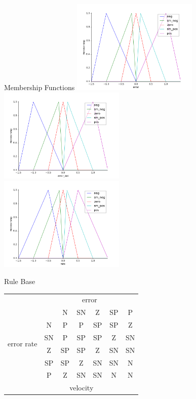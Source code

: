 \documentclass[]{beamer}
\begin{document}
\begin{frame}{Membership Functions}
    \centering
    \vspace{1em}
    \includegraphics[width=0.45\textwidth]{../images/error_in.png}
    \includegraphics[width=0.45\textwidth]{../images/error_del_in.png}\\
    \includegraphics[width=0.45\textwidth]{../images/vel_out.png}
\end{frame}

\begin{frame}[fragile]{Rule Base}
    \centering
    \hspace{3em}
    \begin{tabular}{cc||c|c|c|c|c|}
        &  \multicolumn{6}{c}{error}  \\ 	
        \multirow{6}{*}{error rate} &    & N  & SN & Z  & SP & P  \\ 	\hhline{~=#=|=|=|=|=|}
                                    & N  & P  & P  & SP & SP & Z  \\ 	\cline{2-7}
                                    & SN & P  & SP & SP & Z  & SN \\ 	\cline{2-7}
                                    & Z  & SP & SP & Z  & SN & SN \\ 	\cline{2-7}
                                    & SP & SP & Z  & SN & SN & N  \\ 	\cline{2-7}
                                    & P  & Z  & SN & SN & N  & N  \\ 	\cline{2-7}
                                    & \multicolumn{5}{c}{\hspace{4em}velocity}\\
    \end{tabular}
\end{frame}
\end{document}
